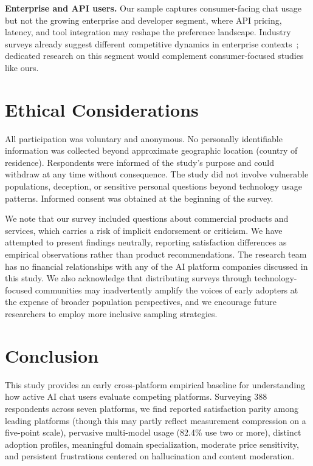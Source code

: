 \documentclass[10pt,twocolumn]{article}
\begin{document}
\textbf{Enterprise and API users.} Our sample captures consumer-facing chat usage but not the growing enterprise and developer segment, where API pricing, latency, and tool integration may reshape the preference landscape. Industry surveys already suggest different competitive dynamics in enterprise contexts~\cite{menlo2025}; dedicated research on this segment would complement consumer-focused studies like ours.


\section{Ethical Considerations}

All participation was voluntary and anonymous. No personally identifiable information was collected beyond approximate geographic location (country of residence). Respondents were informed of the study's purpose and could withdraw at any time without consequence. The study did not involve vulnerable populations, deception, or sensitive personal questions beyond technology usage patterns. Informed consent was obtained at the beginning of the survey.

We note that our survey included questions about commercial products and services, which carries a risk of implicit endorsement or criticism. We have attempted to present findings neutrally, reporting satisfaction differences as empirical observations rather than product recommendations. The research team has no financial relationships with any of the AI platform companies discussed in this study. We also acknowledge that distributing surveys through technology-focused communities may inadvertently amplify the voices of early adopters at the expense of broader population perspectives, and we encourage future researchers to employ more inclusive sampling strategies.


\section{Conclusion}

This study provides an early cross-platform empirical baseline for understanding how active AI chat users evaluate competing platforms. Surveying 388 respondents across seven platforms, we find reported satisfaction parity among leading platforms (though this may partly reflect measurement compression on a five-point scale), pervasive multi-model usage (82.4\% use two or more), distinct adoption profiles, meaningful domain specialization, moderate price sensitivity, and persistent frustrations centered on hallucination and content moderation.
\end{document}
